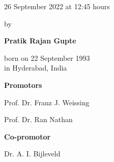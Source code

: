 \begin{titlepage}
\begin{addmargin}[-1cm]{-3cm}
\begin{center}
{            \vspace{3mm}

            26 September 2022 at 12:45 hours

            \vspace{10mm}

            by

            \vspace{10mm}

            \textbf{Pratik Rajan Gupte}

            \vspace{3mm}

            born on 22 September 1993\\
            in Hyderabad, India
        }

    \end{center}

    \pagebreak
    \thispagestyle{empty}

    \textbf{Promotors}
    \begin{description}
        \item Prof. Dr. Franz J. Weissing
        \item Prof. Dr. Ran Nathan
    \end{description}

    \vspace{6mm}

    \textbf{Co-promotor}
    \begin{description}
        \item Dr. A. I. Bijleveld
    \end{description}



  \end{addmargin}

\end{titlepage}


    

